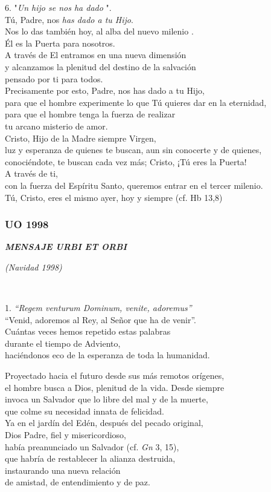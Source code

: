 6. "\emph{Un hijo se nos ha dado} ".\\
Tú, Padre, nos \emph{has dado a tu Hijo}.\\
Nos lo das también hoy, al alba del nuevo milenio .\\
Él es la Puerta para nosotros.\\
A través de El entramos en una nueva dimensión\\
y alcanzamos la plenitud del destino de la salvación\\
pensado por ti para todos.\\
Precisamente por esto, Padre, nos has dado a tu Hijo,\\
para que el hombre experimente lo que Tú quieres dar en la eternidad,\\
para que el hombre tenga la fuerza de realizar\\
tu arcano misterio de amor.\\
Cristo, Hijo de la Madre siempre Virgen,\\
luz y esperanza de quienes te buscan, aun sin conocerte y de quienes,
conociéndote, te buscan cada vez más; Cristo, ¡Tú eres la Puerta!\\
A través de ti,\\
con la fuerza del Espíritu Santo, queremos entrar en el tercer
milenio.\\
Tú, Cristo, eres el mismo ayer, hoy y siempre (cf. Hb 13,8)

\subsubsection{UO 1998}
\textbf{\emph{MENSAJE URBI ET ORBI}}

\emph{(Navidad 1998)}

~

1. \emph{``Regem venturum Dominum, venite, adoremus''}\\
``Venid, adoremos al Rey, al Señor que ha de venir''.\\
Cuántas veces hemos repetido estas palabras\\
durante el tiempo de Adviento,\\
haciéndonos eco de la esperanza de toda la humanidad.

Proyectado hacia el futuro desde sus más remotos orígenes,\\
el hombre busca a Dios, plenitud de la vida. Desde siempre\\
invoca un Salvador que lo libre del mal y de la muerte,\\
que colme su necesidad innata de felicidad.\\
Ya en el jardín del Edén, después del pecado original,\\
Dios Padre, fiel y misericordioso,\\
había preanunciado un Salvador (cf. \emph{Gn} 3, 15),\\
que habría de restablecer la alianza destruida,\\
instaurando una nueva relación\\
de amistad, de entendimiento y de paz.

